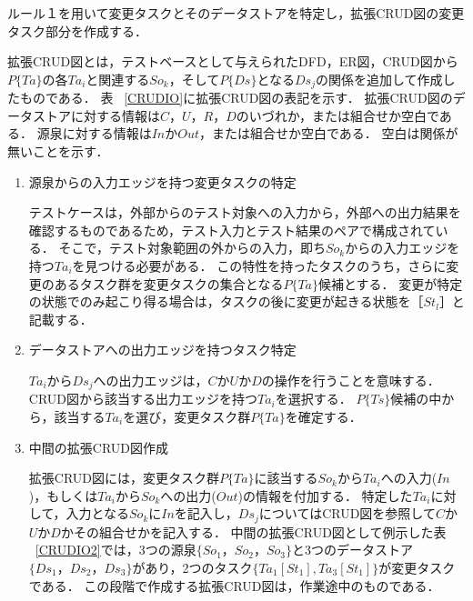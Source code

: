 ルール１を用いて変更タスクとそのデータストアを特定し，拡張CRUD図の変更タスク部分を作成する．


拡張CRUD図とは，テストベースとして与えられたDFD，ER図，CRUD図から$P\{Ta\}$の各$Ta_i$と関連する$So_k$，そして$P\{Ds\}$となる$Ds_j$の関係を追加して作成したものである．
表 ~\ref{CRUDIO}に拡張CRUD図の表記を示す．
拡張CRUD図のデータストアに対する情報は$C$，$U$，$R$，$D$のいづれか，または組合せか空白である．
源泉に対する情報は$In$か$Out$，または組合せか空白である．
空白は関係が無いことを示す．

\begin{enumerate}
\item 源泉からの入力エッジを持つ変更タスクの特定

テストケースは，外部からのテスト対象への入力から，外部への出力結果を確認するものであるため，テスト入力とテスト結果のペアで構成されている．
そこで，テスト対象範囲の外からの入力，即ち$So_k$からの入力エッジを持つ$Ta_i$を見つける必要がある．
この特性を持ったタスクのうち，さらに変更のあるタスク群を変更タスクの集合となる$P\{Ta\}$候補とする．
変更が特定の状態でのみ起こり得る場合は，タスクの後に変更が起きる状態を［$St_l$］と記載する．

\item データストアへの出力エッジを持つタスク特定

$Ta_i$から$Ds_j$への出力エッジは，$C$か$U$か$D$の操作を行うことを意味する．CRUD図から該当する出力エッジを持つ$Ta_i$を選択する．
$P\{Ts\}$候補の中から，該当する$Ta_i$を選び，変更タスク群$P\{Ta\}$を確定する．

\item 中間の拡張CRUD図作成

拡張CRUD図には，変更タスク群$P\{Ta\}$に該当する$So_k$から$Ta_i$への入力($In$)，もしくは$Ta_i$から$So_k$への出力($Out$)の情報を付加する．
特定した$Ta_i$に対して，入力となる$So_k$に$In$を記入し，$Ds_j$についてはCRUD図を参照して$C$か$U$か$D$かその組合せかを記入する．
中間の拡張CRUD図として例示した表 ~\ref{CRUDIO2}では，3つの源泉$\{So_1，So_2，So_3\}$と3つのデータストア$\{Ds_1，Ds_2，Ds_3\}$があり，2つのタスク$\{Ta_1[St_1],Ta_3[St_1]\}$が変更タスクである．
この段階で作成する拡張CRUD図は，作業途中のものである．

\end{enumerate}


